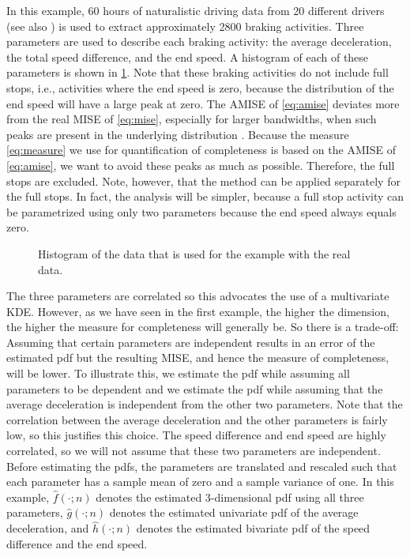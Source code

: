 In this example, 60 hours of naturalistic driving data from 20 different drivers (see also \textcite{deGelder2017assessment}) is used to extract approximately 2800 braking activities. Three parameters are used to describe each braking activity: the average deceleration, the total speed difference, and the end speed. A histogram of each of these parameters is shown in \cref{fig:histogram}. Note that these braking activities do not include full stops, i.e., activities where the end speed is zero, because the distribution of the end speed will have a large peak at zero. The AMISE of \cref{eq:amise} deviates more from the real MISE of \cref{eq:mise}, especially for larger bandwidths, when such peaks are present in the underlying distribution \cite{marron1992exact}. Because the measure \cref{eq:measure} we use for quantification of completeness is based on the AMISE of \cref{eq:amise}, we want to avoid these peaks as much as possible. Therefore, the full stops are excluded.
\cstart
Note, however, that the method can be applied separately for the full stops. In fact, the analysis will be simpler, because a full stop activity can be parametrized using only two parameters because the end speed always equals zero. 
\cend

\setlength{}
\setlength{}
\begin{figure}
	\centering
	
	\caption{Histogram of the data that is used for the example with the real data.}
	\label{fig:histogram}
\end{figure}

The three parameters are correlated so this advocates the use of a multivariate KDE. However, as we have seen in the first example, the higher the dimension, the higher the measure for completeness will generally be. So there is a trade-off: Assuming that certain parameters are independent results in an error of the estimated pdf but the resulting MISE, and hence the measure of completeness, will be lower. To illustrate this, we estimate the pdf while assuming all parameters to be dependent and we estimate the pdf while assuming that the average deceleration is independent from the other two parameters. Note that the correlation between the average deceleration and the other parameters is fairly low, so this justifies this choice. The speed difference and end speed are highly correlated, so we will not assume that these two parameters are independent. Before estimating the pdfs, the parameters are translated and rescaled such that each parameter has a sample mean of zero and a sample variance of one. In this example, $\hat{f}(\cdot;n)$ denotes the estimated 3-dimensional pdf using all three parameters, $\hat{g}(\cdot;n)$ denotes the estimated univariate pdf of the average deceleration, and $\hat{h}(\cdot;n)$ denotes the estimated bivariate pdf of the speed difference and the end speed.

